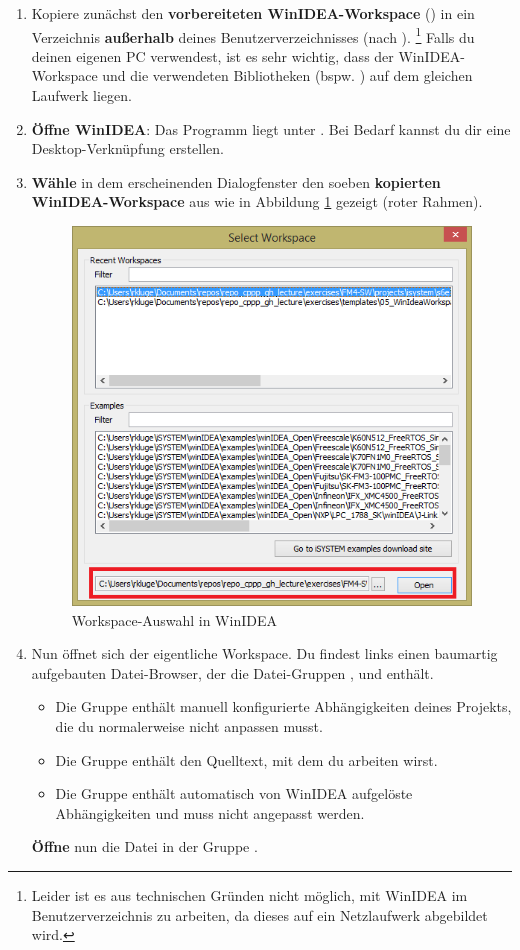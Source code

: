 \begin{enumerate}
\item 
Kopiere zunächst den \textbf{vorbereiteten WinIDEA-Workspace} () in ein Verzeichnis \textbf{außerhalb} deines Benutzerverzeichnisses (\bspw nach ).
\footnote{Leider ist es aus technischen Gründen nicht möglich, mit WinIDEA im Benutzerverzeichnis zu arbeiten, da dieses auf ein Netzlaufwerk abgebildet wird.}
Falls du deinen eigenen PC verwendest, ist es sehr wichtig, dass der WinIDEA-Workspace und die verwendeten Bibliotheken (bspw. ) auf dem gleichen Laufwerk liegen.

\item 
\textbf{Öffne WinIDEA}:
Das Programm liegt unter .
Bei Bedarf kannst du dir eine Desktop-Verknüpfung erstellen.

\item 
\textbf{Wähle} in dem erscheinenden Dialogfenster den soeben \textbf{kopierten WinIDEA-Workspace} aus wie in Abbildung \ref{fig:WinIdeaSelectWorkspace} gezeigt (roter Rahmen).
\begin{figure}
\begin{centering}
\includegraphics[width=.5\textwidth]{./05_c/figures/WinIDEASelectWorkspace.png}
\caption{Workspace-Auswahl in WinIDEA}
\label{fig:WinIdeaSelectWorkspace}
\end{centering}
\end{figure}

\item 
Nun öffnet sich der eigentliche Workspace.
Du findest links einen baumartig aufgebauten Datei-Browser, der die Datei-Gruppen ,  und  enthält.
\begin{itemize}
\item
Die Gruppe  enthält manuell konfigurierte Abhängigkeiten deines Projekts, die du normalerweise nicht anpassen musst.
\item 
Die Gruppe  enthält den Quelltext, mit dem du arbeiten wirst.
\item 
Die Gruppe  enthält automatisch von WinIDEA aufgelöste Abhängigkeiten und muss nicht angepasst werden.
\end{itemize}
\textbf{Öffne} nun die Datei \textbf{} in der Gruppe .


\end{enumerate}
